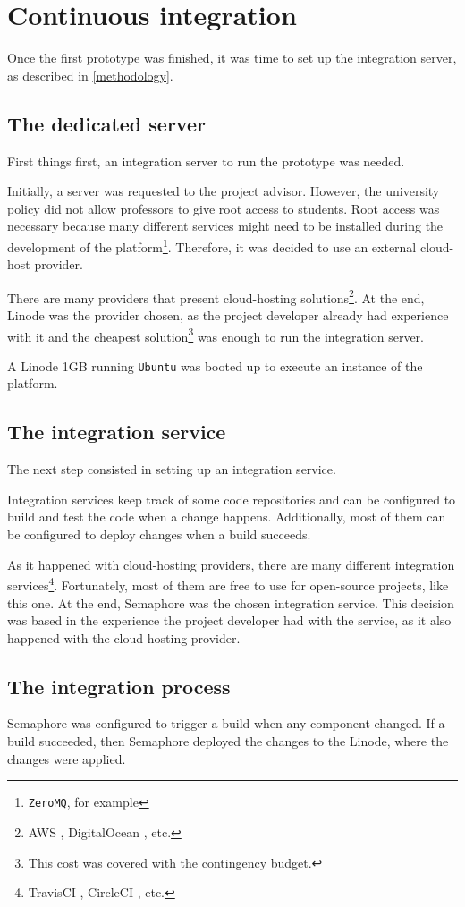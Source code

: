 \documentclass[a4paper,11pt,titlepage,abstract,numbers=noenddot,automark,mnsy,intlimits,rgb,dvipsnames]{report}
\begin{document}
\chapter{Continuous integration}
Once the first prototype was finished, it was time to set up the integration server, as described in
\autoref{methodology}.
\section{The dedicated server}
First things first, an integration server to run the prototype was needed.

Initially, a server was requested to the project advisor. However, the university policy did not allow professors
to give root access to students. Root access was necessary because many different services might need to be installed during the
development of the platform\footnote{\texttt{ZeroMQ}, for example}. Therefore, it was decided to use an external cloud-host provider.

There are many providers that present cloud-hosting solutions\footnote{AWS \cite{aws}, DigitalOcean \cite{digital_ocean}, etc.}.
At the end, Linode \cite{linode} was the provider chosen, as the project developer already had experience with it and
the cheapest solution\footnote{This cost was covered with the contingency budget.} was enough to run the integration server.

A Linode 1GB \cite{linode} running \texttt{Ubuntu} was booted up to execute an
instance of the platform.
\section{The integration service}
The next step consisted in setting up an integration service.

Integration services keep track of some code repositories and can be configured to build and test the code when a change 
happens. Additionally, most of them can be configured to deploy changes when a build succeeds.

As it happened with cloud-hosting providers, there are many different integration
services\footnote{TravisCI \cite{travisci}, CircleCI \cite{circleci}, etc.}. Fortunately, most of them
are free to use for open-source projects, like this one. At the end, Semaphore \cite{semaphoreci} was the chosen
integration service. This decision was based in the experience the project developer had with the service, as it
also happened with the cloud-hosting provider.
\section{The integration process}
Semaphore was configured to trigger a build when any component
changed. If a build succeeded, then Semaphore deployed the changes to the Linode, where the changes were applied.
\end{document}
